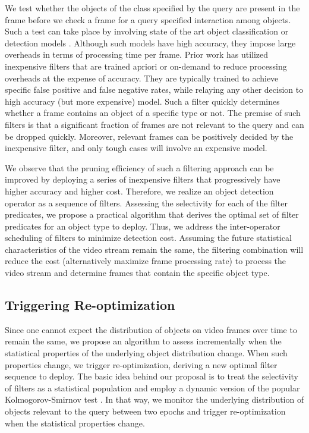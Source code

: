 \documentclass[sigconf]{acmart}
\begin{document}
We test whether the objects of the class specified by the query are present in the frame before we check a frame for a query specified interaction among objects. Such a test can take place by involving state of the art object classification or detection models \cite{girshick2015fast, simonyan2014very}. Although such models have high accuracy, they impose large overheads in terms of processing time per frame. Prior work \cite{kang2017noscope, Xarchakos2019} has utilized inexpensive filters that are trained apriori or on-demand to reduce processing overheads at the expense of accuracy. 
They are typically trained to achieve specific false positive and false negative rates, while relaying any other decision to high accuracy (but more expensive) model. Such a filter quickly determines whether a frame contains an object of a specific type or not. The premise of such filters is that a significant fraction of frames are not relevant to the query and can be dropped quickly. Moreover, relevant frames can be positively decided by the inexpensive filter, and only tough cases will involve an expensive model. 

We observe that the pruning efficiency of such a filtering approach can be improved by deploying a series of inexpensive filters that progressively have higher accuracy and higher cost. Therefore, we realize an object detection operator as a sequence of filters. Assessing the selectivity for each of the filter predicates, we propose a practical algorithm that derives the optimal set of filter predicates for an object type to deploy. Thus, we address the inter-operator scheduling of filters to minimize detection cost. Assuming the future statistical characteristics of the video stream remain the same, the filtering combination will reduce the cost (alternatively maximize frame processing rate) to process the video stream and determine frames that contain the specific object type.

\subsection{Triggering Re-optimization}
\label{sec:triggering}

Since one cannot expect the distribution of objects on video frames over time to remain the same, we propose an algorithm to assess incrementally when the statistical properties of the underlying object distribution change. When such properties change, we trigger re-optimization, deriving a new optimal filter sequence to deploy. The basic idea behind our proposal is to treat the selectivity of filters as a statistical population and employ a dynamic version of the popular Kolmogorov-Smirnov test \cite{massey1951kolmogorov}. In that way, we monitor the underlying distribution of objects relevant to the query between two epochs and trigger re-optimization when the statistical properties change.
\end{document}
